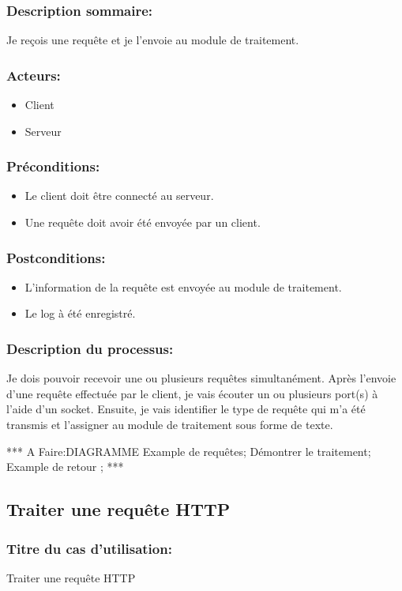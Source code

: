 \documentclass{scrreprt}
\begin{document}
\subsubsection{Description sommaire:} Je reçois une requête et je l'envoie au module de traitement.
\subsubsection{Acteurs:}
\begin{itemize}
    \item Client
    \item Serveur
\end{itemize}
\subsubsection{Préconditions:}
\begin{itemize}
	\item Le client doit être connecté au serveur.
    \item Une requête doit avoir été envoyée par un client.
\end{itemize} 
\subsubsection{Postconditions:}
\begin{itemize}
    \item  L'information de la requête est envoyée au module de traitement.
    \item  Le log à été enregistré.
\end{itemize} 
\subsubsection{Description du processus:}
Je dois pouvoir recevoir une ou plusieurs requêtes simultanément. Après l'envoie d'une requête effectuée par le client, je vais écouter un ou plusieurs port(s) à l'aide d'un socket. Ensuite, je vais identifier le type de requête qui m'a été transmis et l'assigner au module de traitement sous forme de texte.


*** A Faire:DIAGRAMME
Example de requêtes;
Démontrer le traitement;
Example de retour ;
***

\subsection{Traiter une requête HTTP}
\subsubsection{Titre du cas d'utilisation:} Traiter une requête HTTP
\end{document}
